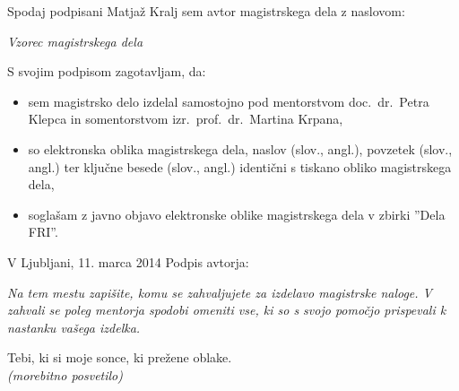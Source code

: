 \documentclass[a4paper, 12pt]{book}
\newcommand{\clearemptydoublepage}{\newpage{\pagestyle{empty}\cleardoublepage}}
\begin{document}
\vspace{1cm}
\noindent Spodaj podpisani Matjaž Kralj sem avtor magistrskega dela z naslovom:

\vspace{0.5cm}
\emph{Vzorec magistrskega dela}

\vspace{1.5cm}
\noindent S svojim podpisom zagotavljam, da:
\begin{itemize}
	\item sem magistrsko delo izdelal samostojno pod mentorstvom
		doc.\ dr.\ Petra Klepca in somentorstvom izr.\ prof.\ dr.\ Martina Krpana,

	\item so elektronska oblika magistrskega dela, naslov (slov., angl.), povzetek (slov., angl.) ter ključne besede (slov., angl.) identični s tiskano obliko magistrskega dela,
	\item soglašam z javno objavo elektronske oblike magistrskega dela v zbirki ''Dela FRI''.
\end{itemize}

\vspace{1cm}
\noindent V Ljubljani, 11. marca 2014 \hfill Podpis avtorja:

\clearemptydoublepage

\thispagestyle{empty}\mbox{}\vfill\null\it%
Na tem mestu zapišite, komu se zahvaljujete za izdelavo magistrske naloge. V zahvali se poleg mentorja spodobi omeniti vse, ki so s svojo pomočjo prispevali k nastanku vašega izdelka.

\rm\normalfont

\clearemptydoublepage

\thispagestyle{empty}\mbox{}{\textheight}\mbox{}\hfill\begin{minipage}{0.55\textwidth}%
Tebi, ki si moje sonce, ki prežene oblake.\\
{\it (morebitno posvetilo)}
\normalfont\end{minipage}

\clearemptydoublepage

\def\thepage{}%
\tableofcontents{}


\clearemptydoublepage

\end{document}
